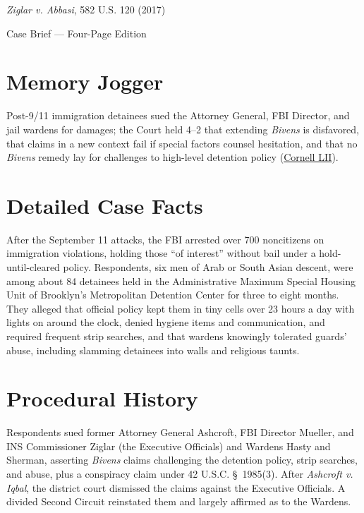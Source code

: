 \documentclass[12pt]{article}
\begin{document}
\begin{center}
{\LARGE \textit{Ziglar v. Abbasi}, 582 U.S. 120 (2017)\par}
\vspace{0.8em}
{\large Case Brief --- Four-Page Edition\par}
\end{center}
\vspace{1em}

\section{Memory Jogger}

Post-9/11 immigration detainees sued the Attorney General, FBI Director, and jail wardens for damages; the Court held 4--2 that extending \textit{Bivens} is disfavored, that claims in a new context fail if special factors counsel hesitation, and that no \textit{Bivens} remedy lay for challenges to high-level detention policy (\href{https://www.law.cornell.edu/supremecourt/text/15-1358}{Cornell LII}).

\section{Detailed Case Facts}

After the September 11 attacks, the FBI arrested over 700 noncitizens on immigration violations, holding those ``of interest'' without bail under a hold-until-cleared policy. Respondents, six men of Arab or South Asian descent, were among about 84 detainees held in the Administrative Maximum Special Housing Unit of Brooklyn's Metropolitan Detention Center for three to eight months. They alleged that official policy kept them in tiny cells over 23 hours a day with lights on around the clock, denied hygiene items and communication, and required frequent strip searches, and that wardens knowingly tolerated guards' abuse, including slamming detainees into walls and religious taunts.

\section{Procedural History}

Respondents sued former Attorney General Ashcroft, FBI Director Mueller, and INS Commissioner Ziglar (the Executive Officials) and Wardens Hasty and Sherman, asserting \textit{Bivens} claims challenging the detention policy, strip searches, and abuse, plus a conspiracy claim under 42 U.S.C. \S~1985(3). After \textit{Ashcroft v. Iqbal}, the district court dismissed the claims against the Executive Officials. A divided Second Circuit reinstated them and largely affirmed as to the Wardens.
\end{document}
